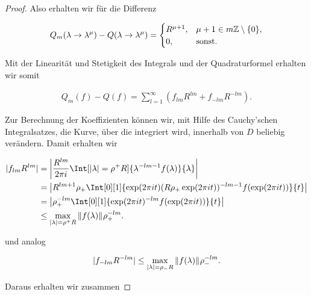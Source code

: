 \begin{proof}
    Also erhalten wir für die Differenz
    
    \begin{align*}
        Q_m(\lambda \to \lambda^\mu) - Q(\lambda \to \lambda^\mu)
        =
        \begin{cases}
            R^{\mu + 1}, & \mu + 1 \in m \mathbb{Z} \setminus {\left \{ 0 \right \}}, \\
            0,           & \text{sonst}.
        \end{cases}
    \end{align*}
    
    Mit der Linearität und Stetigkeit des Integrals und der Quadraturformel erhalten wir somit
    
    \begin{align*}
        Q_m(f) - Q(f)
        =
        \sum_{l=1}^\infty
            (f_{l m}R^{l m} + f_{-l m} R^{-l m}).
    \end{align*}
    
    Zur Berechnung der Koeffizienten können wir, mit Hilfe des Cauchy'schen Integralsatzes, die Kurve, über die integriert wird, innerhalb von $D$ beliebig verändern.
    Damit erhalten wir
    
    \begin{align*}
        |f_{l m}R^{l m}|
        & =
        \abs
        {
            \frac{R^{l m}}{2\pi i}
            \Int[|\lambda| = \rho^+R]{\lambda^{-l m - 1} f(\lambda)}{\lambda}
        } \\
        & =
        \abs
        {
            R^{l m+1} \rho_+
            \Int[0][1]
            {
                \exp(2\pi i t)
                (R \rho_+ \exp(2 \pi i t))^{-l m -1} f(\exp(2 \pi i t))
            }{t}
        } \\
        & =
        \abs
        {
            \rho_+^{-l m}
            \Int[0][1]
            {
                \exp(2 \pi i t)^{-l m} f(\exp(2\pi i t))
            }{t}
        } \\
        & \leq
        \max_{|\lambda| = \rho^+R}
            \norm{f(\lambda)}
            \rho_+^{-l m}.
    \end{align*}
    
    und analog
    
    \begin{align*}
        |f_{-l m}R^{-l m}|
        \leq
        \max_{|\lambda| = \rho_-R}
            {\left \| f(\lambda) \right \|}_{}
            \rho_-^{-l m}.
    \end{align*}
    
    Daraus erhalten wir zusammen
    

\end{proof}
